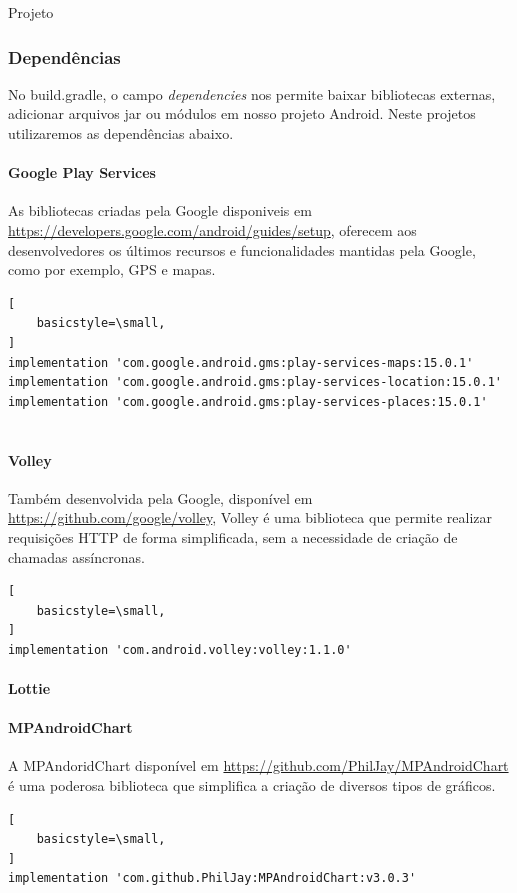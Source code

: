 \documentclass[
	12pt,				%
	openright,			%
	twoside,			%
	a4paper,			%
	english,			%
	french,				%
	spanish,			%
	brazil				%
	]{abntex2}
\begin{document}
\begin{chapter}{Projeto}
\subsubsection{Dependências}
 No build.gradle, o campo \textit{dependencies} nos permite baixar bibliotecas externas, adicionar arquivos jar ou módulos em nosso projeto Android. Neste projetos utilizaremos as dependências abaixo.
 
   \paragraph{Google Play Services}
   As bibliotecas criadas pela Google disponiveis em \url{https://developers.google.com/android/guides/setup}, oferecem aos desenvolvedores os últimos recursos e funcionalidades mantidas pela Google, como por exemplo, GPS e mapas.
       \begin{lstlisting}[
    basicstyle=\small,
] 
implementation 'com.google.android.gms:play-services-maps:15.0.1'
implementation 'com.google.android.gms:play-services-location:15.0.1'
implementation 'com.google.android.gms:play-services-places:15.0.1'
  
\end{lstlisting}
   \paragraph{Volley}
   Também desenvolvida pela Google, disponível em \url{https://github.com/google/volley}, Volley é uma biblioteca que permite realizar requisições HTTP de forma simplificada, sem a necessidade de criação de chamadas assíncronas.
       \begin{lstlisting}[
    basicstyle=\small,
]
implementation 'com.android.volley:volley:1.1.0'  
\end{lstlisting}

\paragraph{Lottie}
\label{Lottie}

   \paragraph{MPAndroidChart}
   A  MPAndoridChart disponível em \url{https://github.com/PhilJay/MPAndroidChart} é uma poderosa biblioteca que simplifica a criação de diversos tipos de gráficos. 
        \begin{lstlisting}[
    basicstyle=\small,
] 
implementation 'com.github.PhilJay:MPAndroidChart:v3.0.3'
  

\end{lstlisting}
\end{chapter}
\end{document}
